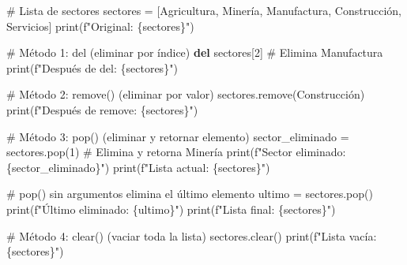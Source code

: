 \documentclass[
  doc,
  floatsintext,
  longtable,
  a4paper,
  nolmodern,
  notxfonts,
  notimes,
  12pt,
  colorlinks=true,linkcolor=blue,citecolor=blue,urlcolor=blue]{apa7}
\newenvironment{Shaded}{\begin{snugshade}}{\end{snugshade}}
\newcommand{\BuiltInTok}[1]{\textcolor[rgb]{0.00,0.23,0.31}{#1}}
\newcommand{\CommentTok}[1]{\textcolor[rgb]{0.37,0.37,0.37}{#1}}
\newcommand{\DecValTok}[1]{\textcolor[rgb]{0.68,0.00,0.00}{#1}}
\newcommand{\KeywordTok}[1]{\textcolor[rgb]{0.00,0.23,0.31}{\textbf{#1}}}
\newcommand{\NormalTok}[1]{\textcolor[rgb]{0.00,0.23,0.31}{#1}}
\newcommand{\OperatorTok}[1]{\textcolor[rgb]{0.37,0.37,0.37}{#1}}
\newcommand{\SpecialCharTok}[1]{\textcolor[rgb]{0.37,0.37,0.37}{#1}}
\newcommand{\SpecialStringTok}[1]{\textcolor[rgb]{0.13,0.47,0.30}{#1}}
\newcommand{\StringTok}[1]{\textcolor[rgb]{0.13,0.47,0.30}{#1}}
\begin{document}
\begin{Shaded}
\begin{Highlighting}[]
\CommentTok{\# Lista de sectores}
\NormalTok{sectores }\OperatorTok{=}\NormalTok{ [}\StringTok{\textquotesingle{}Agricultura\textquotesingle{}}\NormalTok{, }\StringTok{\textquotesingle{}Minería\textquotesingle{}}\NormalTok{, }\StringTok{\textquotesingle{}Manufactura\textquotesingle{}}\NormalTok{, }\StringTok{\textquotesingle{}Construcción\textquotesingle{}}\NormalTok{, }\StringTok{\textquotesingle{}Servicios\textquotesingle{}}\NormalTok{]}
\BuiltInTok{print}\NormalTok{(}\SpecialStringTok{f"Original: }\SpecialCharTok{\{}\NormalTok{sectores}\SpecialCharTok{\}}\SpecialStringTok{"}\NormalTok{)}

\CommentTok{\# Método 1: del (eliminar por índice)}
\KeywordTok{del}\NormalTok{ sectores[}\DecValTok{2}\NormalTok{]  }\CommentTok{\# Elimina \textquotesingle{}Manufactura\textquotesingle{}}
\BuiltInTok{print}\NormalTok{(}\SpecialStringTok{f"Después de del: }\SpecialCharTok{\{}\NormalTok{sectores}\SpecialCharTok{\}}\SpecialStringTok{"}\NormalTok{)}

\CommentTok{\# Método 2: remove() (eliminar por valor)}
\NormalTok{sectores.remove(}\StringTok{\textquotesingle{}Construcción\textquotesingle{}}\NormalTok{)}
\BuiltInTok{print}\NormalTok{(}\SpecialStringTok{f"Después de remove: }\SpecialCharTok{\{}\NormalTok{sectores}\SpecialCharTok{\}}\SpecialStringTok{"}\NormalTok{)}

\CommentTok{\# Método 3: pop() (eliminar y retornar elemento)}
\NormalTok{sector\_eliminado }\OperatorTok{=}\NormalTok{ sectores.pop(}\DecValTok{1}\NormalTok{)  }\CommentTok{\# Elimina y retorna \textquotesingle{}Minería\textquotesingle{}}
\BuiltInTok{print}\NormalTok{(}\SpecialStringTok{f"Sector eliminado: }\SpecialCharTok{\{}\NormalTok{sector\_eliminado}\SpecialCharTok{\}}\SpecialStringTok{"}\NormalTok{)}
\BuiltInTok{print}\NormalTok{(}\SpecialStringTok{f"Lista actual: }\SpecialCharTok{\{}\NormalTok{sectores}\SpecialCharTok{\}}\SpecialStringTok{"}\NormalTok{)}

\CommentTok{\# pop() sin argumentos elimina el último elemento}
\NormalTok{ultimo }\OperatorTok{=}\NormalTok{ sectores.pop()}
\BuiltInTok{print}\NormalTok{(}\SpecialStringTok{f"Último eliminado: }\SpecialCharTok{\{}\NormalTok{ultimo}\SpecialCharTok{\}}\SpecialStringTok{"}\NormalTok{)}
\BuiltInTok{print}\NormalTok{(}\SpecialStringTok{f"Lista final: }\SpecialCharTok{\{}\NormalTok{sectores}\SpecialCharTok{\}}\SpecialStringTok{"}\NormalTok{)}

\CommentTok{\# Método 4: clear() (vaciar toda la lista)}
\NormalTok{sectores.clear()}
\BuiltInTok{print}\NormalTok{(}\SpecialStringTok{f"Lista vacía: }\SpecialCharTok{\{}\NormalTok{sectores}\SpecialCharTok{\}}\SpecialStringTok{"}\NormalTok{)}
\end{Highlighting}
\end{Shaded}
\end{document}
